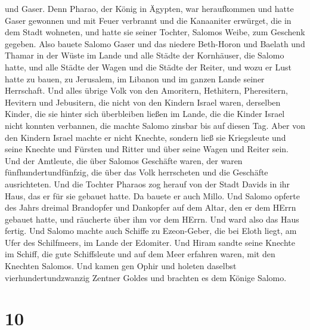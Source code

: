 und Gaser.  Denn Pharao, der König in Ägypten, war
heraufkommen und hatte Gaser gewonnen und mit Feuer verbrannt und die
Kanaaniter erwürget, die in dem Stadt wohneten, und hatte sie seiner
Tochter, Salomos Weibe, zum Geschenk gegeben.  Also bauete
Salomo Gaser und das niedere Beth-Horon  und Baelath und
Thamar in der Wüste im Lande  und alle Städte der
Kornhäuser, die Salomo hatte, und alle Städte der Wagen und die Städte
der Reiter, und wozu er Lust hatte zu bauen, zu Jerusalem, im Libanon
und im ganzen Lande seiner Herrschaft.  Und alles übrige
Volk von den Amoritern, Hethitern, Pheresitern, Hevitern und Jebusitern,
die nicht von den Kindern Israel waren,  derselben Kinder,
die sie hinter sich überbleiben ließen im Lande, die die Kinder Israel
nicht konnten verbannen, die machte Salomo zinsbar bis auf diesen Tag.
 Aber von den Kindern Israel machte er nicht Knechte,
sondern ließ sie Kriegsleute und seine Knechte und Fürsten und Ritter
und über seine Wagen und Reiter sein.  Und der Amtleute,
die über Salomos Geschäfte waren, der waren fünfhundertundfünfzig, die
über das Volk herrscheten und die Geschäfte ausrichteten. 
Und die Tochter Pharaos zog herauf von der Stadt Davids in ihr Haus, das
er für sie gebauet hatte. Da bauete er auch Millo.  Und
Salomo opferte des Jahrs dreimal Brandopfer und Dankopfer auf dem Altar,
den er dem HErrn gebauet hatte, und räucherte über ihm vor dem HErrn.
Und ward also das Haus fertig.  Und Salomo machte auch
Schiffe zu Ezeon-Geber, die bei Eloth liegt, am Ufer des Schilfmeers, im
Lande der Edomiter.  Und Hiram sandte seine Knechte im
Schiff, die gute Schiffsleute und auf dem Meer erfahren waren, mit den
Knechten Salomos.  Und kamen gen Ophir und holeten daselbst
vierhundertundzwanzig Zentner Goldes und brachten es dem Könige Salomo.

\hypertarget{section-9}{%
\section{10}\label{section-9}}

